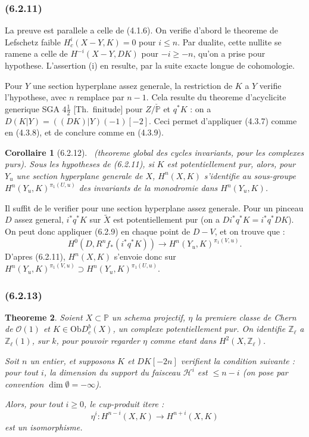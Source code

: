 \documentclass[12pt,a4paper]{article}
\theoremstyle{plain}
\newtheorem{theorem}{Theoreme}[section]
\newtheorem{corollary}[theorem]{Corollaire}
\theoremstyle{definition}
\theoremstyle{remark}
\newcommand{\Ob}{\mathrm{Ob}}
\newcommand{\bbP}{\mathbb{P}}
\newcommand{\scrH}{\mathscr{H}}
\newcommand{\scrO}{\mathscr{O}}
\newcommand{\Zl}{\mathbb{Z}_\ell}
\begin{document}
\subsubsection*{\textup{(6.2.11)}}

La preuve est parallele a celle de (4.1.6). On verifie d'abord le theoreme de Lefschetz faible $H_c^i(X - Y, K) = 0$ pour $i \leq n$. Par dualite, cette nullite se ramene a celle de $H^{-i}(X - Y, DK)$ pour $-i \geq -n$, qu'on a prise pour hypothese. L'assertion (i) en resulte, par la suite exacte longue de cohomologie.

Pour $Y$ une section hyperplane assez generale, la restriction de $K$ a $Y$ verifie l'hypothese, avec $n$ remplace par $n-1$. Cela resulte du theoreme d'acyclicite generique SGA $4\frac{1}{2}$ [Th.~finitude] pour $Z/\check{\bbP}$ et $q^* K$ : on a $D(K|Y) = ((DK)|Y)(-1)[-2]$. Ceci permet d'appliquer (4.3.7) comme en (4.3.8), et de conclure comme en (4.3.9).

\begin{corollary}[6.2.12]\ \textup{(theoreme global des cycles invariants, pour les complexes purs).}
Sous les hypotheses de (6.2.11), si $K$ est potentiellement pur, alors, pour $Y_u$ une section hyperplane generale de $X$, $H^n(X, K)$ s'identifie au sous-groupe $H^n(Y_u, K)^{\pi_1(U, u)}$ des invariants de la monodromie dans $H^n(Y_u, K)$.
\end{corollary}

Il suffit de le verifier pour une section hyperplane assez generale. Pour un pinceau $D$ assez general, $i^* q^* K$ sur $\widetilde{X}$ est potentiellement pur (on a $D i^* q^* K = i^* q^* DK$). On peut donc appliquer (6.2.9) en chaque point de $D - V$, et on trouve que :
\[
H^0(D, R^n f_* (i^* q^* K)) \to H^n(Y_u, K)^{\pi_1(V, u)}.
\]
D'apres (6.2.11), $H^n(X, K)$ s'envoie donc sur $H^n(Y_u, K)^{\pi_1(V, u)} \supset H^n(Y_u, K)^{\pi_1(U, u)}$.

\subsubsection*{\textup{(6.2.13)}}

\begin{theorem}
Soient $X \subset \bbP$ un schema projectif, $\eta$ la premiere classe de Chern de $\scrO(1)$ et $K \in \Ob D_c^b(X)$, un complexe potentiellement pur. On identifie $\Zl$ a $\Zl(1)$, sur $k$, pour pouvoir regarder $\eta$ comme etant dans $H^2(X, \Zl)$.

Soit $n$ un entier, et supposons $K$ et $DK[-2n]$ verifient la condition suivante : pour tout $i$, la dimension du support du faisceau $\scrH^i$ est $\leq n - i$ (on pose par convention $\dim \emptyset = -\infty$).

Alors, pour tout $i \geq 0$, le cup-produit itere :
\[
\eta^i : H^{n-i}(X, K) \to H^{n+i}(X, K)
\]
est un isomorphisme.
\end{theorem}
\end{document}
